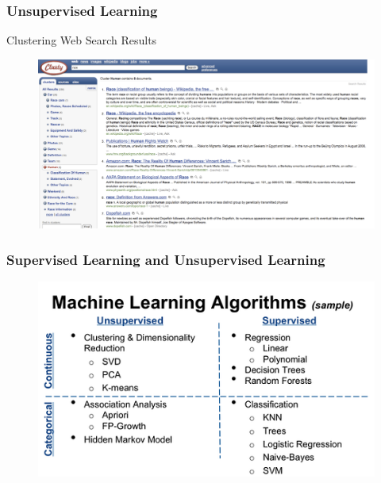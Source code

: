 \documentclass[9pt]{beamer}
\begin{document}
\begin{CJK*}{GBK}{kai}
\begin{frame}
	\frametitle{Unsupervised Learning}
	\begin{block}{Clustering Web Search Results}	
	\begin{figure}[h]
		\centering
		\includegraphics[scale=0.4]{WebSearchClustering.png}		
	\end{figure}
	\end{block}
\end{frame}

\begin{frame}
	\frametitle{Supervised Learning and Unsupervised Learning}
	\begin{figure}[h]
		\centering
		\includegraphics[scale=0.8]{TDR2}
		

\end{figure}
\end{frame}
\end{CJK*}
\end{document}
